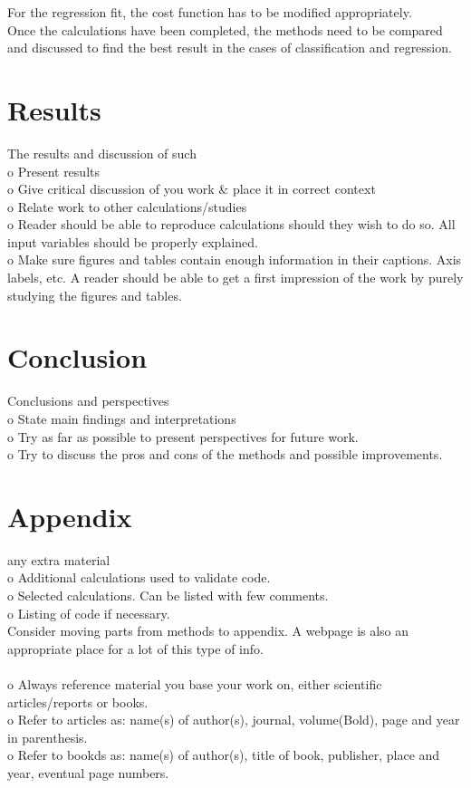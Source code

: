 \documentclass[12pt, a4paper]{scrartcl}
\begin{document}
    For the regression fit, the cost function has to be modified appropriately.\\
    
    Once the calculations have been completed, the methods need to be compared and discussed to 
find the best result in the cases of classification and regression. 


\section{Results}
    The results and discussion of such\\
    o   Present results \\
    o   Give critical discussion of you work \& place it in correct context\\
    o   Relate work to other calculations/studies\\
    o   Reader should be able to reproduce calculations should they wish to do so. 
        All input variables should be properly explained. \\
    o   Make sure figures and tables contain enough information in their captions. 
        Axis labels, etc. A reader should be able to get a first impression of the work
        by purely studying the figures and tables. \\
\section{Conclusion}
    Conclusions and perspectives\\
    o   State main findings and interpretations \\
    o   Try as far as possible to present perspectives for future work. \\
    o   Try to discuss the pros and cons of the methods and possible improvements. \\
\section{Appendix}
    any extra material \\
    o   Additional calculations used to validate code. \\
    o   Selected calculations. Can be listed with few comments. \\
    o   Listing of code if necessary. \\
    Consider moving parts from methods to appendix. A webpage is also an appropriate place
    for a lot of this type of info. \\\\

    o   Always reference material you base your work on, either scientific articles/reports
        or books. \\
    o   Refer to articles as: name(s) of author(s), journal, volume(Bold), page and year in
        parenthesis. \\
    o   Refer to bookds as: name(s) of author(s), title of book, publisher, place and year, 
        eventual page numbers. \\


\end{document}
